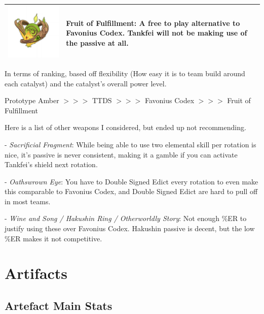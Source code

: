 \documentclass[11pt]{article}
\begin{document}
\begin{tabular}{| m{}  | m{} |}
\hline  \includegraphics[scale = 0.18]{WeaponFruitofFulfillment.png}  & Fruit of Fulfillment: A free to play alternative to Favonius Codex. Tankfei will not be making use of the passive at all. \\
\hline 
\end{tabular} 

In terms of ranking, based off flexibility (How easy it is to team build around each catalyst) and the catalyst's overall power level.

\begin{center}
Prototype Amber $>>>$ TTDS $>>>$  Favonius Codex $>>>$ Fruit of Fulfillment
\end{center}

Here is a list of other weapons I considered, but ended up not recommending.

- \textit{Sacrificial Fragment}: While being able to use two elemental skill per rotation is nice, it's passive is never consistent, making it a gamble if you can activate Tankfei's shield next rotation. 

- \textit{Oathswrown Eye}: You have to Double Signed Edict every rotation to even make this comparable to Favonius Codex, and Double Signed Edict are hard to pull off in most teams. 

- \textit{Wine and Song / Hakushin Ring / Otherworldly Story}: Not enough \%ER to justify using these over Favonius Codex. Hakushin passive is decent, but the low \%ER makes it not competitive.

\newpage 

\section{Artifacts}

\subsection{Artefact Main Stats}
\end{document}
